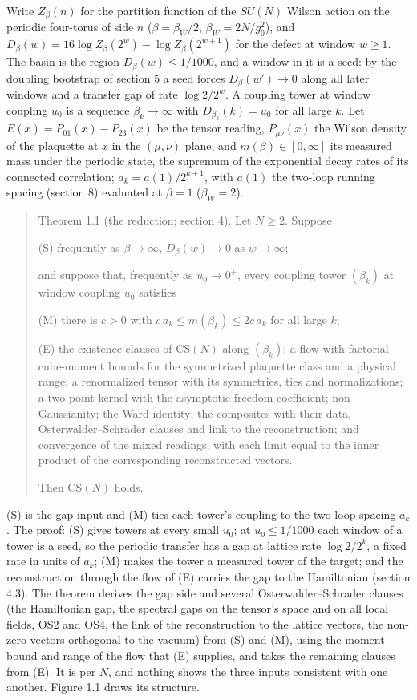\documentclass[10pt,letterpaper,twocolumn]{article}
\begin{document}
Write \(Z_\beta(n)\) for the partition function of the \(SU(N)\) Wilson action on the periodic four-torus of side \(n\) (\(\beta=\beta_W/2\), \(\beta_W=2N/g_0^2\)), and \(D_\beta(w)=16\log Z_\beta(2^w)-\log Z_\beta(2^{w+1})\) for the defect at window \(w\ge1\). The basin is the region \(D_\beta(w)\le1/1000\), and a window in it is a seed: by the doubling bootstrap of section 5 a seed forces \(D_\beta(w')\to0\) along all later windows and a transfer gap of rate \(\log2/2^w\). A coupling tower at window coupling \(u_0\) is a sequence \(\beta_k\to\infty\) with \(D_{\beta_k}(k)=u_0\) for all large \(k\). Let \(E(x)=P_{01}(x)-P_{23}(x)\) be the tensor reading, \(P_{\mu\nu}(x)\) the Wilson density of the plaquette at \(x\) in the \((\mu,\nu)\) plane, and \(m(\beta)\in[0,\infty]\) its measured mass under the periodic state, the supremum of the exponential decay rates of its connected correlation; \(a_k=a(1)/2^{k+1}\), with \(a(1)\) the two-loop running spacing (section 8) evaluated at \(\beta=1\) (\(\beta_W=2\)).

\begin{quote}
Theorem 1.1 (the reduction; section 4). Let \(N\ge2\). Suppose

(S) frequently as \(\beta\to\infty\), \(D_\beta(w)\to0\) as \(w\to\infty\);

and suppose that, frequently as \(u_0\to0^+\), every coupling tower \((\beta_k)\) at window coupling \(u_0\) satisfies

(M) there is \(c>0\) with \(c\,a_k\le m(\beta_k)\le2c\,a_k\) for all large \(k\);

(E) the existence clauses of \(\mathrm{CS}(N)\) along \((\beta_k)\): a flow with factorial cube-moment bounds for the symmetrized plaquette class and a physical range; a renormalized tensor with its symmetries, ties and normalizations; a two-point kernel with the asymptotic-freedom coefficient; non-Gaussianity; the Ward identity; the composites with their data, Osterwalder--Schrader clauses and link to the reconstruction; and convergence of the mixed readings, with each limit equal to the inner product of the corresponding reconstructed vectors.

Then \(\mathrm{CS}(N)\) holds.
\end{quote}

(S) is the gap input and (M) ties each tower's coupling to the two-loop spacing \(a_k\). The proof: (S) gives towers at every small \(u_0\); at \(u_0\le1/1000\) each window of a tower is a seed, so the periodic transfer has a gap at lattice rate \(\log2/2^k\), a fixed rate in units of \(a_k\); (M) makes the tower a measured tower of the target; and the reconstruction through the flow of (E) carries the gap to the Hamiltonian (section 4.3). The theorem derives the gap side and several Osterwalder--Schrader clauses (the Hamiltonian gap, the spectral gaps on the tensor's space and on all local fields, OS2 and OS4, the link of the reconstruction to the lattice vectors, the non-zero vectors orthogonal to the vacuum) from (S) and (M), using the moment bound and range of the flow that (E) supplies, and takes the remaining clauses from (E). It is per \(N\), and nothing shows the three inputs consistent with one another. Figure 1.1 draws its structure.
\end{document}
